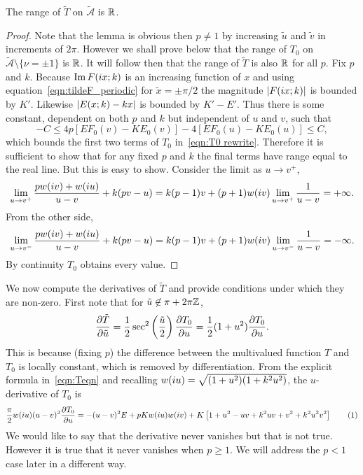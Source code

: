 \documentclass{article}
\begin{document}
\begin{lem}
\label{lem:range_T}
The range of $\tilde{T}$ on $\mathcal{\tilde{A}}$ is $\mathbb{R}$.

\begin{proof}
Note that the lemma is obvious then $p\neq 1$ by increasing $\tilde{u}$ and $\tilde{v}$ in increments of $2\pi$. However we shall prove below that the range of $T_0$ on $\mathcal{\tilde{A}} \setminus \{\nu = \pm 1\}$ is $\mathbb{R}$. It will follow then that the range of $\tilde{T}$ is also $\mathbb{R}$ for all $p$. Fix $p$ and $k$. Because $\operatorname{Im} F(i x;k)$ is an increasing function of $x$ and using equation~\ref{eqn:tildeF_periodic} for $\tilde{x}=\pm\pi/2$ the magnitude $\left|F(i x;k)\right|$ is bounded by $K'$. Likewise $\left|E(x;k) - kx\right|$ is bounded by $K'-E'$. Thus there is some constant, dependent on both $p$ and $k$ but independent of $u$ and $v$, such that
\[
-C \leq 4p \left[ E F_0(v) - K E_0(v) \right]-4 \left[ E F_0(u) - K E_0(u) \right] \leq C,
\]
which bounds the first two terms of $T_0$ in~\eqref{eqn:T0 rewrite}.
Therefore it is sufficient to show that for any fixed $p$ and $k$ the final terms have range equal to the real line. But this is easy to show. Consider the limit as $u \to v^+$,
\[
\lim_{u \to v^+} \frac{pw(i v) + w(i u)}{u-v} + k(pv-u)
= k(p-1)v + (p+1) w(i v)\lim_{u \to v^+} \frac{1}{u-v} = +\infty.
\]
From the other side,
\[
\lim_{u \to v^-} \frac{pw(i v) + w(i u)}{u-v} + k(pv-u)
= k(p-1)v + (p+1) w(i v)\lim_{u \to v^-} \frac{1}{u-v} = -\infty.
\]
By continuity $T_0$ obtains every value.
\end{proof}
\end{lem}


We now compute the derivatives of $\tilde{T}$ and provide conditions under which they are non-zero. First note that for $\tilde{u} \not\in \pi + 2\pi\mathbb{Z}$,
\[
\frac{\partial \tilde{T}}{\partial \tilde{u}} 
= \frac{1}{2}\sec^2\left(\frac{\tilde{u}}{2}\right) \frac{\partial T_0}{\partial u}
= \frac{1}{2}(1+u^2) \frac{\partial T_0}{\partial u}.
\] 
This is because (fixing $p$) the difference between the multivalued function $T$ and $T_0$ is locally constant, which is removed by differentiation.
From the explicit formula in~\eqref{eqn:Teqn} and recalling $w(i u) = \sqrt{(1+u^2)(1+k^2 u^2)}$, the $u$-derivative of $T_0$ is
\[
\frac{\pi}{2}w(\iu u)(u-v)^2\Partial{T_0}{u}
= -(u-v)^2 E + pKw(\iu u)w(\iu v) + K\left[ 1 + u^2 - uv + k^2 uv + v^2 + k^2 u^2 v^2 \right]
\labelthis{eqn:dTdu}
\]
We would like to say that the derivative never vanishes but that is not true. However it is true that it never vanishes when $p \geq 1$. We will address the $p < 1$ case later in a different way.
\end{document}
